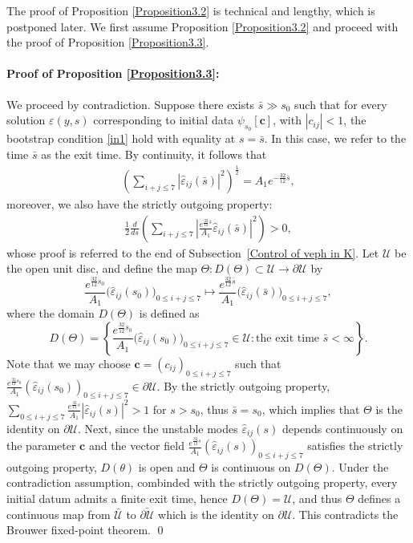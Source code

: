 \documentclass[11pt,reqno]{amsart}
\theoremstyle{definition}
\theoremstyle{bfremark}
\numberwithin{equation}{section}
\newcommand{\veph}{\hat\varepsilon }
\begin{document}
The proof of Proposition \ref{Proposition3.2} is technical and lengthy, which is postponed later. We first assume Proposition \ref{Proposition3.2} and proceed with the proof of Proposition \ref{Proposition3.3}.\\

\paragraph{\textbf{Proof of Proposition \ref{Proposition3.3}:}} We proceed by contradiction. Suppose there exists \(\bar{s} \gg s_0\) such that for every solution \(\varepsilon(y,s)\) corresponding to initial data \(\psi_{s_0}[\mathbf{c}]\), with \(|c_{ij}| < 1\), the bootstrap condition \eqref{in1} hold with equality at \(s=\bar s\). In this case, we refer to the time \(\bar{s}\) as the exit time. By continuity, it follows that
\begin{align}
    \left( \sum_{i+j \leq 7} |\veph_{ij}(\bar{s})|^2 \right)^{\frac{1}{2}} = A_1 e^{-\frac{32}{12}\bar{s}}, \label{contrahypo}
\end{align}
moreover, we also have the strictly outgoing property:
\begin{align}
    \frac{1}{2} \frac{d}{ds} \left( \sum_{i+j \leq 7} \left| \frac{e^{\frac{32}{12}\bar{s}}}{A_1} \veph_{ij}(\bar{s}) \right|^2 \right) > 0, \label{strictly}
\end{align}
whose proof is referred to the end of Subsection~\ref{Control of veph in K}.
Let \(\mathcal{U}\) be the open unit disc, and define the map \(\Theta : D(\Theta) \subset \mathcal{U} \to \partial \mathcal{U}\) by
\[
\frac{e^{\frac{32}{12}s_0}}{A_1}\big(\veph_{ij}(s_0)\big)_{0 \leq i+j \leq 7} \mapsto \frac{e^{\frac{32}{12}\bar{s}}}{A_1}\big(\veph_{ij}(\bar{s})\big)_{0 \leq i + j \leq 7},
\]
where the domain \(D(\Theta)\) is defined as
\[
D(\Theta) = \left\{ \frac{e^{\frac{32}{12}s_0}}{A_1}\big(\veph_{ij}(s_0)\big)_{0 \leq i+j \leq 7} \in \mathcal{U} : \text{the exit time } \bar{s} < \infty \right\}.
\]
Note that we may choose $\mathbf{c} = (c_{ij})_{0 \leq i+j \leq 7}$ such that \(\frac{e^{\frac{32}{12}s_0}}{A_1}(\veph_{ij}(s_0))_{0 \leq i+j \leq 7} \in \partial \mathcal{U} \). By the strictly outgoing property, \(\sum_{0 \leq i+j \leq 7}\frac{e^{\frac{32}{12}s}}{A_1}|\veph_{ij}(s)|^2>1\) for \(s>s_0\), thus \(\bar s=s_0\), which implies that \(\Theta\) is the identity on \(\partial \mathcal{ U}\). Next, since the unstable modes \(\veph_{ij}(s)\) depends continuously on the parameter \(\textbf{c}\) and the vector field \(\frac{e^{\frac{32}{12}s}}{A_1}(\veph_{ij}(s))_{0 \leq i+j \leq 7}\) satisfies the strictly outgoing property, \(D(\theta)\) is open and \(\Theta\) is continuous on \( D(\Theta)\). Under the contradiction assumption, combinded with the strictly outgoing property, every initial datum admits a finite exit time, hence \(D(\Theta)=\mathcal{U}\), and thus \(\Theta\) defines a continuous map from \(\bar{\mathcal{U}}\) to \( \bar{\partial\mathcal{U}}\) which is the identity on \( \partial\mathcal{U}\). This contradicts the Brouwer fixed-point theorem.
\qed
\end{document}
